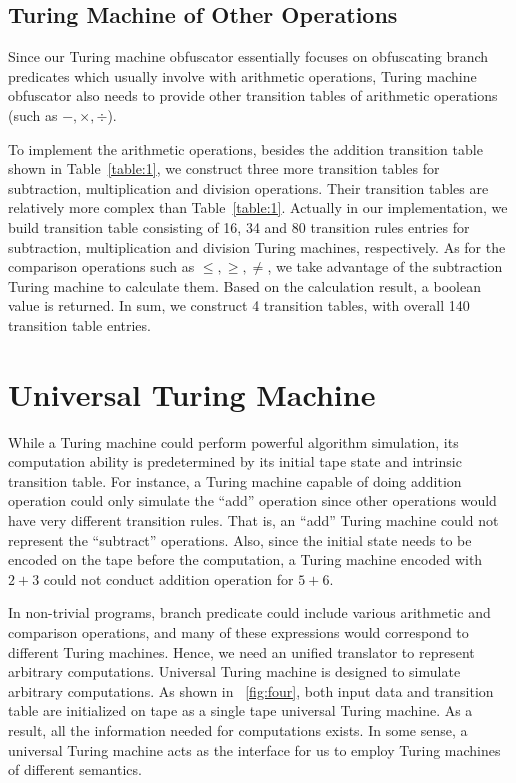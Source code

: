 \subsection{Turing Machine of Other Operations}
Since our Turing machine obfuscator essentially
focuses on obfuscating branch predicates which usually involve with arithmetic operations, Turing machine obfuscator also needs to
provide other transition tables of arithmetic operations (such as $ -, \times,
\div$).

To implement the arithmetic operations, besides the addition transition table
shown in Table~\ref{table:1}, we construct three more transition tables for subtraction,
multiplication and division operations. Their transition tables are relatively
more complex than Table~\ref{table:1}. Actually in our implementation, we build
transition table consisting of 16, 34 and 80 transition rules entries for
subtraction, multiplication and division Turing machines, respectively. As for
the comparison operations such as \(\leq, \geq, \neq\), we take advantage of the
subtraction Turing machine to calculate them. Based on the calculation result, a
boolean value is returned. In sum, we construct 4 transition tables, with
overall 140 transition table entries.

\section{Universal Turing Machine}
While a Turing machine could perform powerful algorithm simulation, its
computation ability is predetermined by its initial tape state and intrinsic
transition table. For instance, a Turing machine capable of doing addition
operation could only simulate the ``add'' operation since other operations would
have very different transition rules. That is, an ``add'' Turing machine could
not represent the ``subtract'' operations. Also, since the initial state needs
to be encoded on the tape before the computation, a Turing machine encoded with
$2 + 3$ could not conduct addition operation for $5 + 6$.

In non-trivial programs, branch predicate could include various arithmetic and
comparison operations, and many of these expressions would correspond to
different Turing machines. Hence, we need an unified translator to represent
arbitrary computations. Universal Turing machine is designed to simulate
arbitrary computations. As shown in \F~\ref{fig:four}, both input data and
transition table are initialized on tape as a single tape universal Turing machine.
As a result, all the information needed for computations exists. 
In some sense, a universal Turing machine acts as the
interface for us to employ Turing machines of different semantics.

